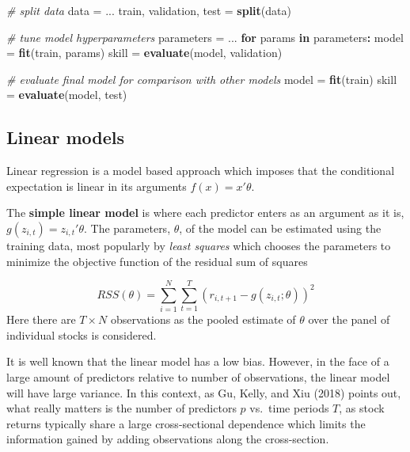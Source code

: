 \documentclass[11pt]{article}
\newenvironment{Shaded}{\begin{snugshade}}{\end{snugshade}}
\newcommand{\CommentTok}[1]{\textcolor[rgb]{0.56,0.35,0.01}{\textit{#1}}}
\newcommand{\ControlFlowTok}[1]{\textcolor[rgb]{0.13,0.29,0.53}{\textbf{#1}}}
\newcommand{\KeywordTok}[1]{\textcolor[rgb]{0.13,0.29,0.53}{\textbf{#1}}}
\newcommand{\NormalTok}[1]{#1}
\newcommand{\OperatorTok}[1]{\textcolor[rgb]{0.81,0.36,0.00}{\textbf{#1}}}
\newcommand{\StringTok}[1]{\textcolor[rgb]{0.31,0.60,0.02}{#1}}
\begin{document}
\begin{Shaded}
\begin{Highlighting}[]
\CommentTok{# split data}
\NormalTok{data =}\StringTok{ }\NormalTok{...}
\NormalTok{train, validation, test =}\StringTok{ }\KeywordTok{split}\NormalTok{(data)}

\CommentTok{# tune model hyperparameters}
\NormalTok{parameters =}\StringTok{ }\NormalTok{...}
\ControlFlowTok{for}\NormalTok{ params }\ControlFlowTok{in}\NormalTok{ parameters}\OperatorTok{:}
\StringTok{    }\NormalTok{model =}\StringTok{ }\KeywordTok{fit}\NormalTok{(train, params)}
\NormalTok{    skill =}\StringTok{ }\KeywordTok{evaluate}\NormalTok{(model, validation)}

\CommentTok{# evaluate final model for comparison with other models}
\NormalTok{model =}\StringTok{ }\KeywordTok{fit}\NormalTok{(train)}
\NormalTok{skill =}\StringTok{ }\KeywordTok{evaluate}\NormalTok{(model, test)}
\end{Highlighting}
\end{Shaded}

\hypertarget{linear-models}{%
\subsection{Linear models}\label{linear-models}}

Linear regression is a model based approach which imposes that the
conditional expectation is linear in its arguments \(f(x) = x'\theta\).

The \textbf{simple linear model} is where each predictor enters as an
argument as it is, \(g(z_{i,t}) =z_{i,t}' \theta\). The
parameters, \(\theta\), of the model can be estimated using the training
data, most popularly by \emph{least squares} which chooses the parameters
to minimize the objective function of the residual sum of squares

\[RSS(\theta) = \sum_{i=1}^N\sum_{t=1}^T (r_{i,t+1} - g(z_{i,t};\theta) )^2\]
Here there are \(T\times N\) observations as the pooled estimate of
\(\theta\) over the panel of individual stocks is considered.

It is well known that the linear model has a low bias. However, in the
face of a large amount of predictors relative to number of observations,
the linear model will have large variance. In this context, as Gu,
Kelly, and Xiu (2018) points out, what really matters is the number of
predictors \(p\) vs.~time periods \(T\), as stock returns typically
share a large cross-sectional dependence which limits the information
gained by adding observations along the cross-section.
\end{document}
